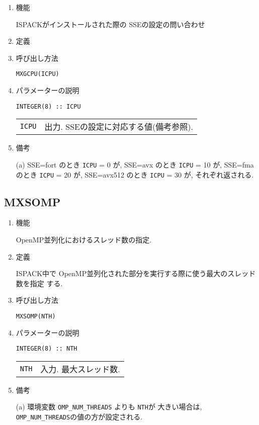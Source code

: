 \documentclass[a4j]{jsarticle}
\begin{document}
\begin{enumerate}

\item 機能 

ISPACKがインストールされた際の SSEの設定の問い合わせ

\item 定義

\item 呼び出し方法 

\texttt{MXGCPU(ICPU)}

\item パラメーターの説明

\begin{verbatim}
INTEGER(8) :: ICPU
\end{verbatim}

\begin{tabular}{ll}
\texttt{ICPU} & 出力. SSEの設定に対応する値(備考参照).
\end{tabular}

\item 備考

  (a) SSE=fort のとき \texttt{ICPU} = 0 が, 
  SSE=avx のとき \texttt{ICPU} = 10 が,
  SSE=fma のとき \texttt{ICPU} = 20 が,
  SSE=avx512 のとき \texttt{ICPU} = 30 が, 
  それぞれ返される.
  
\end{enumerate}



\subsection{MXSOMP}

\begin{enumerate}

\item 機能 

OpenMP並列化におけるスレッド数の指定.

\item 定義

ISPACK中で OpenMP並列化された部分を実行する際に使う最大のスレッド数を指定
する.

\item 呼び出し方法 

\texttt{MXSOMP(NTH)}

\item パラメーターの説明

\begin{verbatim}
INTEGER(8) :: NTH
\end{verbatim}

\begin{tabular}{ll}
\texttt{NTH} & 入力. 最大スレッド数.
\end{tabular}

\item 備考

(a) 環境変数 \texttt{OMP\_NUM\_THREADS} よりも \texttt{NTH}が
   大きい場合は, \texttt{OMP\_NUM\_THREADS}の値の方が設定される.
  
\end{enumerate}
\end{document}
